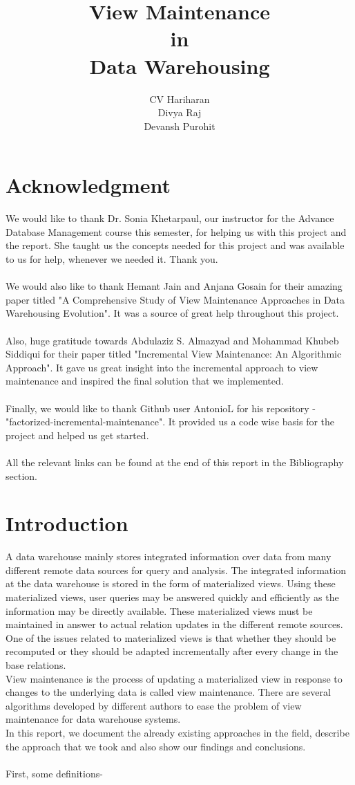 \documentclass[12pt]{report}
\title{\textbf{\Huge View Maintenance \\ \large{in} \\ \Huge Data Warehousing } }
\author{CV Hariharan \bullet 1610110147 \\ Divya Raj \bullet 1610110123 \\ Devansh Purohit \bullet 1610110116}
\date{}
\begin{document}
\maketitle
\section*{Acknowledgment}
We would like to thank Dr. Sonia Khetarpaul, our instructor for the Advance Database Management course this semester, for helping us with this project and the report. She taught us the concepts needed for this project and was available to us for help, whenever we needed it. Thank you.\\
\\We would also like to thank Hemant Jain and Anjana Gosain for their amazing paper titled "A Comprehensive Study of View Maintenance Approaches in 
Data Warehousing Evolution". It was a source of great help throughout this project. \\
\\Also, huge gratitude towards Abdulaziz S. Almazyad and Mohammad Khubeb Siddiqui for their paper titled "Incremental View Maintenance: An Algorithmic 
Approach". It gave us great insight into the incremental approach to view maintenance and inspired the final solution that we implemented.
\\\\Finally, we would like to thank Github user AntonioL for his repository -  "factorized-incremental-maintenance". It provided us a code wise basis for the project and helped us get started.
\\\\All the relevant links can be found at the end of this report in the Bibliography section.
\tableofcontents
\newpage
\renewcommand{\thesection}{\arabic{section}}
\section{Introduction}
A data warehouse mainly stores integrated information over data from 
many different remote data sources for query and analysis. The 
integrated information at the data warehouse is stored in the form of 
materialized views. Using these materialized views, user queries may be 
answered quickly and efficiently as the information may be directly 
available. These materialized views must be maintained in answer to 
actual relation updates in the different remote sources. \\
One of the issues 
related to materialized views is that whether they should be recomputed 
or they should be adapted incrementally after every change in the base 
relations. \\
View maintenance is the process of updating a materialized 
view in response to changes to the underlying data is called view 
maintenance. There are several algorithms developed by different 
authors to ease the problem of view maintenance for data warehouse 
systems. \cite{basic} \\
In this report, we document the already existing approaches in the field, describe the approach that we took and also show our findings and conclusions. 
\\\\First, some definitions-
\end{document}
